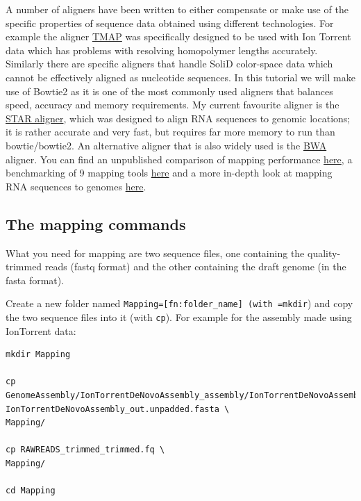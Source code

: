 \documentclass[11pt]{article}
\begin{document}
A number of aligners have been written to either compensate or make use of
the specific properties of sequence data obtained using different
technologies. For example the aligner \href{https://www.google.no/url?sa=t&rct=j&q=&esrc=s&source=web&cd=5&ved=0CD4QFjAE&url=https%3A%2F%2Fgithub.com%2Fiontorrent%2FTMAP&ei=1u07VZCXFYGqywPBz4DoDg&usg=AFQjCNE3vZXuQ1ygljhBcrozKj_nBU84TQ&sig2=u5_YVYBE904ay-9oLUuMOQ&bvm=bv.91665533,d.bGQ}{TMAP} was specifically
designed to be used with Ion Torrent data which has problems with resolving
homopolymer lengths accurately. Similarly there are specific aligners that
handle SoliD color-space data which cannot be effectively aligned as
nucleotide sequences. In this tutorial we will make use of Bowtie2 as it is
one of the most commonly used aligners that balances speed, accuracy and
memory requirements. My current favourite aligner is the \href{http://bioinformatics.oxfordjournals.org/content/early/2012/10/25/bioinformatics.bts635}{STAR aligner}, which
was designed to align RNA sequences to genomic locations; it is rather
accurate and very fast, but requires far more memory to run than bowtie/bowtie2.
An alternative aligner that is also widely used is the \href{http://bio-bwa.sourceforge.net/}{BWA} aligner. You can
find an unpublished comparison of mapping performance \href{http://genomespot.blogspot.no/2014/11/dna-aligner-accuracy-bwa-bowtie-soap.html}{here}, a benchmarking of
9 mapping tools \href{http://bmcbioinformatics.biomedcentral.com/articles/10.1186/1471-2105-14-184}{here} and a more in-depth look at mapping RNA sequences to genomes \href{http://www.nature.com/nmeth/journal/v10/n12/full/nmeth.2722.html}{here}.
\subsection{The mapping commands}
\label{sec-1-1}


What you need for mapping are two sequence files, one containing the
quality-trimmed reads (fastq format) and the other containing the draft genome
(in the fasta format).

Create a new folder named \texttt{Mapping=[fn:folder\_name] (with =mkdir}) and copy the two
sequence files into it (with \texttt{cp}). For example for the assembly made using
IonTorrent data:


\begin{verbatim}
mkdir Mapping

cp GenomeAssembly/IonTorrentDeNovoAssembly_assembly/IonTorrentDeNovoAssembly_d_results/\
IonTorrentDeNovoAssembly_out.unpadded.fasta \
Mapping/

cp RAWREADS_trimmed_trimmed.fq \
Mapping/

cd Mapping
\end{verbatim}
\end{document}
